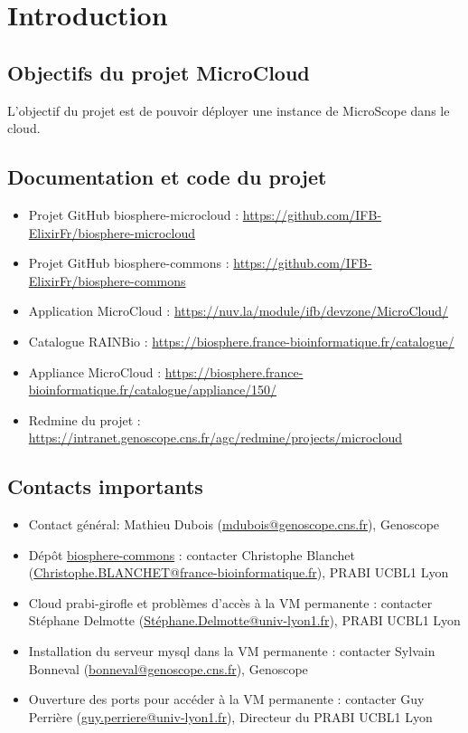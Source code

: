 \section{Introduction}

\subsection{Objectifs du projet MicroCloud}

L'objectif du projet est de pouvoir déployer une instance de MicroScope dans le cloud.

\subsection{Documentation et code du projet}

\begin{itemize}
	\item Projet GitHub biosphere-microcloud : \url{https://github.com/IFB-ElixirFr/biosphere-microcloud}
	\item Projet GitHub biosphere-commons : \url{https://github.com/IFB-ElixirFr/biosphere-commons}
	\item Application MicroCloud : \url{https://nuv.la/module/ifb/devzone/MicroCloud/}
	\item Catalogue RAINBio : \url{https://biosphere.france-bioinformatique.fr/catalogue/}
	\item Appliance MicroCloud : \url{https://biosphere.france-bioinformatique.fr/catalogue/appliance/150/}
	\item Redmine du projet : \url{https://intranet.genoscope.cns.fr/agc/redmine/projects/microcloud}\\
\end{itemize}

\subsection{Contacts importants}

\begin{itemize}
	\item Contact général: Mathieu Dubois (\href{mailto:mdubois@genoscope.cns.fr}{mdubois@genoscope.cns.fr}), Genoscope
	\item Dépôt \href{https://github.com/IFB-ElixirFr/biosphere-commons}{biosphere-commons} : contacter Christophe Blanchet (\href{mailto:Christophe.BLANCHET@france-bioinformatique.fr}{Christophe.BLANCHET@france-bioinformatique.fr}), PRABI UCBL1 Lyon
	\item Cloud prabi-girofle et problèmes d'accès à la VM permanente : contacter Stéphane Delmotte (\href{mailto:Stéphane.Delmotte@univ-lyon1.fr}{Stéphane.Delmotte@univ-lyon1.fr}), PRABI UCBL1 Lyon
	\item Installation du serveur mysql dans la VM permanente : contacter Sylvain Bonneval (\href{mailto:bonneval@genoscope.cns.fr}{bonneval@genoscope.cns.fr}), Genoscope
	\item Ouverture des ports pour accéder à la VM permanente : contacter Guy Perrière (\href{mailto:guy.perriere@univ-lyon1.fr}{guy.perriere@univ-lyon1.fr}), Directeur du PRABI UCBL1 Lyon
\end{itemize}
